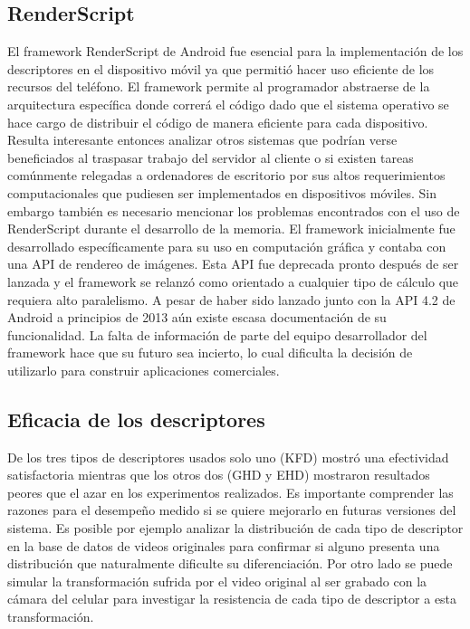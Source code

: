 \subsection*{RenderScript}
El framework RenderScript de Android fue esencial para la implementación de los descriptores en el dispositivo móvil ya que permitió hacer uso eficiente de los recursos del teléfono. El framework permite al programador abstraerse de la arquitectura específica donde correrá el código dado que el sistema operativo se hace cargo de distribuir el código de manera eficiente para cada dispositivo. Resulta interesante entonces analizar otros sistemas que podrían verse beneficiados al traspasar trabajo del servidor al cliente o si existen tareas comúnmente relegadas a ordenadores de escritorio por sus altos requerimientos computacionales que pudiesen ser implementados en dispositivos móviles. 
Sin embargo también es necesario mencionar los problemas encontrados con el uso de RenderScript durante el desarrollo de la memoria. El framework inicialmente fue desarrollado específicamente para su uso en computación gráfica y contaba con una API de rendereo de imágenes. Esta API fue deprecada pronto después de ser lanzada y el framework se relanzó como orientado a cualquier tipo de cálculo que requiera alto paralelismo. A pesar de haber sido lanzado junto con la API 4.2 de Android a principios de 2013 aún existe escasa documentación de su funcionalidad. La falta de información de parte del equipo desarrollador del framework hace que su futuro sea incierto, lo cual dificulta la decisión de utilizarlo para construir aplicaciones comerciales.

\subsection*{Eficacia de los descriptores}
De los tres tipos de descriptores usados solo uno (KFD) mostró una efectividad satisfactoria mientras que los otros dos (GHD y EHD) mostraron resultados peores que el azar en los experimentos realizados. Es importante comprender las razones para el desempeño medido si se quiere mejorarlo en futuras versiones del sistema. Es posible por ejemplo analizar la distribución de cada tipo de descriptor en la base de datos de videos originales para confirmar si alguno presenta una distribución que naturalmente dificulte su diferenciación. Por otro lado se puede simular la transformación sufrida por el video original al ser grabado con la cámara del celular para investigar la resistencia de cada tipo de descriptor a esta transformación.

